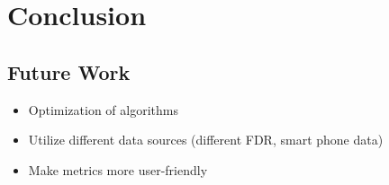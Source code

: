 \chapter{Conclusion} \label{ch:conclusion}



\section{Future Work} \label{sec:future_work}

	\begin{itemize}
    	\item Optimization of algorithms
        \item Utilize different data sources (different FDR, smart phone data)
        \item Make metrics more user-friendly
    \end{itemize}